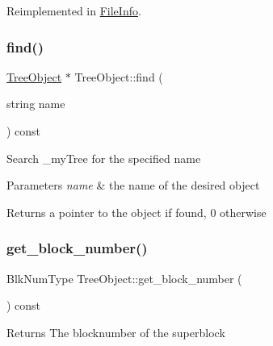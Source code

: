 Reimplemented in \mbox{\hyperlink{class_file_info_ae058242283d3317eaf2b79428e6137f6}{File\+Info}}.

\mbox{\label{class_tree_object_a6a7477c29a06a9896df549f83611252f}} 
\subsubsection{\texorpdfstring{find()}{find()}}
{\footnotesize\ttfamily \mbox{\hyperlink{class_tree_object}{Tree\+Object}} $\ast$ Tree\+Object\+::find (\begin{DoxyParamCaption}\item[{string}]{name }\end{DoxyParamCaption}) const}

Search \+\_\+my\+Tree for the specified name 
\begin{DoxyParams}{Parameters}
{\em name} & the name of the desired object \\
\hline
\end{DoxyParams}
\begin{DoxyReturn}{Returns}
a pointer to the object if found, 0 otherwise 
\end{DoxyReturn}
\mbox{\label{class_tree_object_af7841065fe85d0884341d72669185169}} 
\subsubsection{\texorpdfstring{get\+\_\+block\+\_\+number()}{get\_block\_number()}}
{\footnotesize\ttfamily Blk\+Num\+Type Tree\+Object\+::get\+\_\+block\+\_\+number (\begin{DoxyParamCaption}{ }\end{DoxyParamCaption}) const}

\begin{DoxyReturn}{Returns}
The blocknumber of the superblock 
\end{DoxyReturn}
\mbox{\label{class_tree_object_aa0900ad50c10023e4700f11218d30d7a}} 
